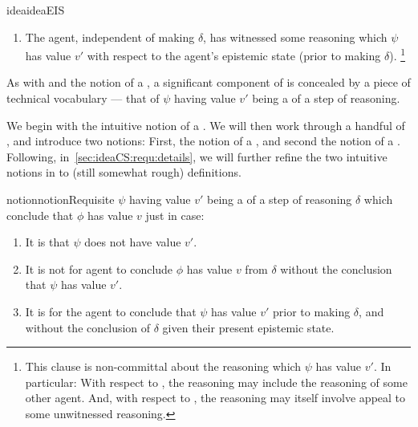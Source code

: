 \begin{note}
\begin{restatable}{idea}{ideaEIS}
\begin{itemize}[leftmargin=*]
\begin{enumerate}[label=\arabic*., ref=(\arabic*)]
\begin{enumerate}[label=\alph*., ref=(\alph*)]
        \item
          \label{idea:CS:B:prior-reasoning}
          The agent, independent of making \(\delta\), has witnessed some reasoning which  \(\psi\) has value \(v'\) with respect to the agent's epistemic state (prior to making \(\delta\)).\nolinebreak
          \footnote{
            This clause is non-committal about the reasoning which  \(\psi\) has value \(v'\).
            In particular:
            With respect to \ESU{}, the reasoning may include the reasoning of some other agent.
            And, with respect to \EAS{}, the reasoning may itself involve appeal to some unwitnessed reasoning.
          }
        \end{enumerate}
      \end{enumerate}
    \end{itemize}
    \vspace{-\baselineskip}
  \end{restatable}
\end{note}

\begin{note}
  As with \ideaS{} and the notion of a \emph{\sink{}}, a significant component of \ideaCS{} is concealed by a piece of technical vocabulary --- that of \(\psi\) having value \(v'\) being a \emph{\requ{}} of a step of reasoning.

  We begin with the intuitive notion of a \requ{}.
  We will then work through a handful of , and introduce two notions:
  First, the notion of a \crequ{}, and second the notion of a \prequ{}.
  Following, in~\autoref{sec:ideaCS:requ:details}, we will further refine the two intuitive notions in to (still somewhat rough) definitions.

  \begin{restatable}[A \requ{0}]{notion}{notionRequisite}
    \label{notion:requ}
    \(\psi\) having value \(v'\) being a \requ{} of a step of reasoning \(\delta\) which conclude that \(\phi\) has value \(v\) just in case:
    \begin{enumerate}
    \item
      \label{notion:requ:psi}
      It is \epVAd{} that \(\psi\) does not have value \(v'\).
    \item
      \label{notion:requ:need-psi}
      It is not \epVAd{} for agent to conclude \(\phi\) has value \(v\) from \(\delta\) without the conclusion \indicateV{} that \(\psi\) has value \(v'\).
    \item
      \label{notion:requ:possible-psi}
      It is \epVAd{} for the agent to conclude that \(\psi\) has value \(v'\) prior to making \(\delta\), and without the conclusion of \(\delta\) given their present epistemic state.
    \end{enumerate}
    \vspace{-\baselineskip}
  \end{restatable}
\end{note}

